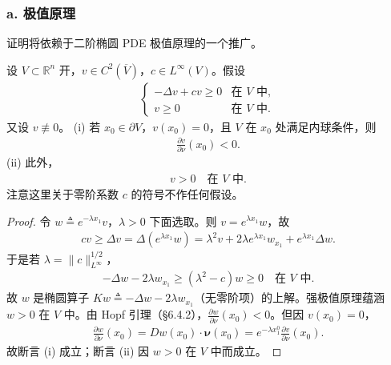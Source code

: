 \documentclass[../../main.tex]{subfiles}
\begin{document}
\subsubsection*{a. 极值原理}\label{subsubsection:ch09-5-2-a-极值原理}

证明将依赖于二阶椭圆 PDE 极值原理的一个推广。

\begin{lemma}\label{lemma:ch09-5-1-Hopf精化}
设 $V\subset\mathbb{R}^n$ 开，$v\in C^2(\overline{V})$，$c\in L^\infty(V)$。假设
\begin{align}
\begin{cases}
-\Delta v+cv\geqslant 0&\text{在 }V\text{ 中},\\
v\geqslant 0&\text{在 }V\text{ 中}.
\end{cases}\label{align:ch09-5-eq04}
\end{align}
又设 $v\not\equiv 0$。
(i) 若 $x_0\in\partial V$，$v(x_0)=0$，且 $V$ 在 $x_0$ 处满足内球条件，则
\begin{align}
\frac{\partial v}{\partial\nu}(x_0)<0.\label{align:ch09-5-eq05}
\end{align}
(ii) 此外，
\begin{align}
v>0\quad\text{在 }V\text{ 中}.\label{align:ch09-5-eq06}
\end{align}
注意这里关于零阶系数 $c$ 的符号不作任何假设。
\begin{proof}
令 $w\triangleq e^{-\lambda x_1}v$，$\lambda>0$ 下面选取。则 $v=e^{\lambda x_1}w$，故
\begin{align*}
cv\geqslant\Delta v=\Delta(e^{\lambda x_1}w)=\lambda^2v+2\lambda e^{\lambda x_1}w_{x_1}+e^{\lambda x_1}\Delta w.
\end{align*}
于是若 $\lambda=\|c\|_{L^\infty}^{1/2}$，
\begin{align*}
-\Delta w-2\lambda w_{x_1}\geqslant(\lambda^2-c)w\geqslant 0\quad\text{在 }V\text{ 中}.
\end{align*}
故 $w$ 是椭圆算子 $Kw\triangleq-\Delta w-2\lambda w_{x_1}$（无零阶项）的上解。强极值原理蕴涵 $w>0$ 在 $V$ 中。由 Hopf 引理（\S6.4.2），$\frac{\partial w}{\partial\nu}(x_0)<0$。但因 $v(x_0)=0$，
\begin{align*}
\frac{\partial w}{\partial\nu}(x_0)=Dw(x_0)\cdot\boldsymbol{\nu}(x_0)=e^{-\lambda x_1^0}\frac{\partial v}{\partial\nu}(x_0).
\end{align*}
故断言 (i) 成立；断言 (ii) 因 $w>0$ 在 $V$ 中而成立。
\end{proof}
\end{lemma}
\end{document}
